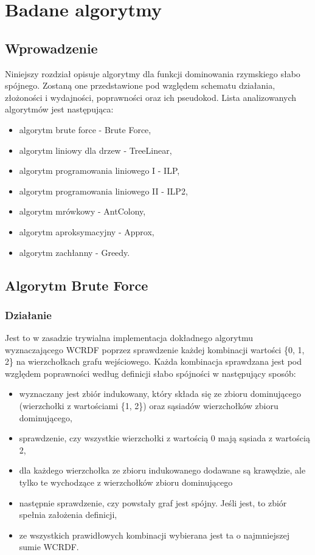 \chapter{Badane algorytmy}

\section{Wprowadzenie}
Niniejszy rozdział opisuje algorytmy dla funkcji dominowania rzymskiego słabo spójnego. Zostaną one przedstawione pod względem schematu działania, złożoności i wydajności, poprawności oraz ich pseudokod. Lista analizowanych algorytmów jest następująca:

\begin{itemize}
    \item algorytm brute force - Brute Force,
    \item algorytm liniowy dla drzew - TreeLinear,
    \item algorytm programowania liniowego I - ILP,
    \item algorytm programowania liniowego II - ILP2,
    \item algorytm mrówkowy - AntColony,
    \item algorytm aproksymacyjny - Approx,
    \item algorytm zachłanny - Greedy.
\end{itemize}

\section{Algorytm Brute Force}

\subsection{Działanie}
Jest to w zasadzie trywialna implementacja dokładnego algorytmu wyznaczającego WCRDF poprzez sprawdzenie każdej kombinacji wartości \{0, 1, 2\} na wierzchołkach grafu wejściowego. Każda kombinacja sprawdzana jest pod względem poprawności według definicji słabo spójności w następujący sposób:
\begin{itemize}
    \item wyznaczany jest zbiór indukowany, który składa się ze zbioru dominującego (wierzchołki z wartościami \{1, 2\}) oraz sąsiadów wierzchołków zbioru dominującego,
    \item sprawdzenie, czy wszystkie wierzchołki z wartością 0 mają sąsiada z wartością 2,
    \item dla każdego wierzchołka ze zbioru indukowanego dodawane są krawędzie, ale tylko te wychodzące z wierzchołków zbioru dominującego
    \item następnie sprawdzenie, czy powstały graf jest spójny. Jeśli jest, to zbiór spełnia założenia definicji,
    \item ze wszystkich prawidłowych kombinacji wybierana jest ta o najmniejszej sumie WCRDF.
\end{itemize}

